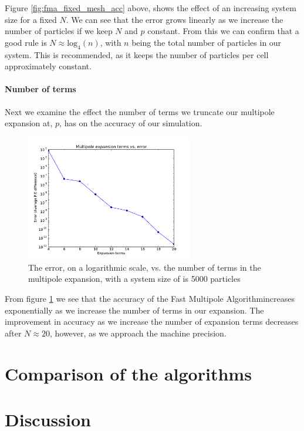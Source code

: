 \documentclass[pdftex,twoside,a4paper]{report}
\newcommand{\bcen}{\begin{center}}
\newcommand{\ecen}{\end{center}}
\newcommand{\fma}{Fast Multipole Algorithm}
\begin{document}
Figure \ref{fig:fma_fixed_mesh_acc} above, shows the effect of an increasing system size for a fixed $N$. We can see that the error grows linearly as we increase the number of particles if we keep $N$ and $p$ constant. From this we can confirm that a good rule is $N \approx \text{log}_4(n)$, with $n$ being the total number of particles in our system. This is recommended, as it keeps the number of particles per cell approximately constant. %

\subsubsection{Number of terms}
Next we examine the effect the number of terms we truncate our multipole expansion at, $p$, has on the accuracy of our simulation.
\begin{figure}[H]
\bcen \includegraphics[width=0.65\textwidth]{figures/graphs/fma_terms_acc.pdf} \ecen
\caption{The error, on a logarithmic scale, vs. the number of terms in the multipole expansion, with a system size of is 5000 particles}
\label{fig:fma_terms_acc}
\end{figure}

From figure \ref{fig:fma_terms_acc} we see that the accuracy of the \fma increases exponentially as we increase the number of terms in our expansion. The improvement in accuracy as we increase the number of expansion terms decreases after $N \approx 20$, however, as we approach the machine precision.


\chapter{Comparison of the algorithms}
\label{chap:compare}
\chapter{Discussion}

	
	
\end{document}

